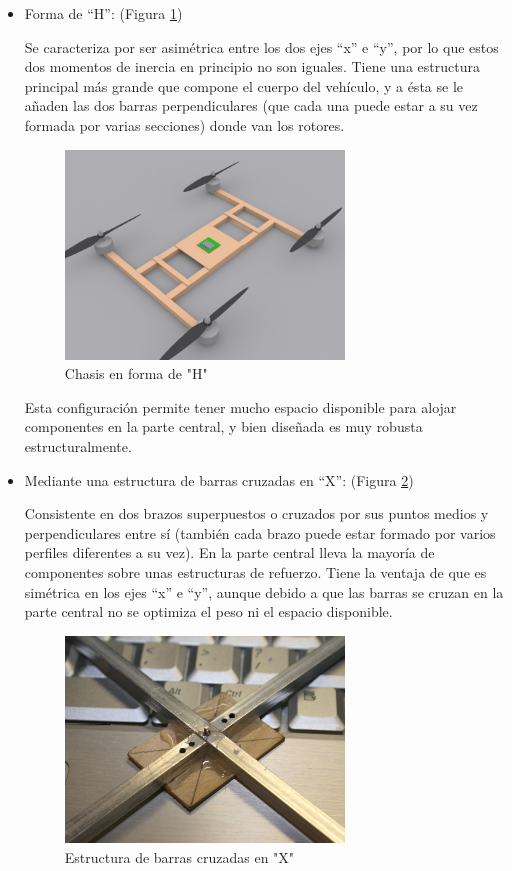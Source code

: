 \documentclass[12pt,twoside]{article}
\begin{document}
		\begin{itemize}
			\item Forma de “H”: (Figura \ref{fig:chasis_H}) 

Se caracteriza por ser asimétrica entre los dos ejes “x” e “y”, por lo que estos dos momentos de inercia en principio no son iguales. Tiene una estructura principal más grande que compone el cuerpo del vehículo, y a ésta se le añaden las dos barras perpendiculares (que cada una puede estar a su vez formada por varias secciones) donde van los rotores.

		\begin{figure}
			\centering
			\includegraphics[width=0.7\textwidth]{Imatges/Disseny_Chasis/quadH.png}
			\caption{Chasis en forma de "H"}
			\label{fig:chasis_H}
		\end{figure}

Esta configuración permite tener mucho espacio disponible para alojar componentes en la parte central, y bien diseñada es muy robusta estructuralmente.
			
		\item Mediante una estructura de barras cruzadas en “X”:  (Figura \ref{fig:chasis_X})
		
Consistente en dos brazos superpuestos o cruzados por sus puntos medios y perpendiculares entre sí (también cada brazo puede estar formado por varios perfiles diferentes a su vez). En la parte central lleva la mayoría de componentes sobre unas estructuras de refuerzo. Tiene la ventaja de que es simétrica en los ejes “x” e “y”, aunque debido a que las barras se cruzan en la parte central no se optimiza el peso ni el espacio disponible.
		\begin{figure}
			\centering
			\includegraphics[width=0.7\textwidth]{Imatges/Disseny_Chasis/Chasis_barras_enteras.png}
			\caption{Estructura de barras cruzadas en "X"}
			\label{fig:chasis_X}
		\end{figure}


\end{itemize}
\end{document}
